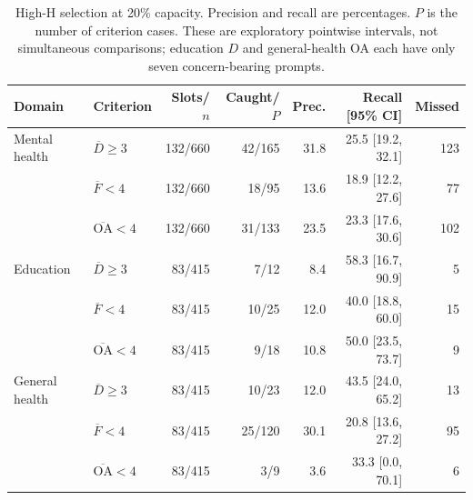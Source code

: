 \begin{table}[t]
\centering\small
\caption{High-H selection at 20\% capacity. Precision and recall are percentages. $P$ is the number of criterion cases. These are exploratory pointwise intervals, not simultaneous comparisons; education $D$ and general-health OA each have only seven concern-bearing prompts.}
\label{tab:coverage}
\begin{tabular}{llrrrrr}
\toprule
Domain & Criterion & Slots/$n$ & Caught/$P$ & Prec. & Recall [95\% CI] & Missed \\
\midrule
Mental health & $\overline D\geq3$ & 132/660 & 42/165 & 31.8 & 25.5 [19.2, 32.1] & 123 \\
 & $\overline F<4$ & 132/660 & 18/95 & 13.6 & 18.9 [12.2, 27.6] & 77 \\
 & $\overline{\mathrm{OA}}<4$ & 132/660 & 31/133 & 23.5 & 23.3 [17.6, 30.6] & 102 \\
Education & $\overline D\geq3$ & 83/415 & 7/12 & 8.4 & 58.3 [16.7, 90.9] & 5 \\
 & $\overline F<4$ & 83/415 & 10/25 & 12.0 & 40.0 [18.8, 60.0] & 15 \\
 & $\overline{\mathrm{OA}}<4$ & 83/415 & 9/18 & 10.8 & 50.0 [23.5, 73.7] & 9 \\
General health & $\overline D\geq3$ & 83/415 & 10/23 & 12.0 & 43.5 [24.0, 65.2] & 13 \\
 & $\overline F<4$ & 83/415 & 25/120 & 30.1 & 20.8 [13.6, 27.2] & 95 \\
 & $\overline{\mathrm{OA}}<4$ & 83/415 & 3/9 & 3.6 & 33.3 [0.0, 70.1] & 6 \\
\bottomrule
\end{tabular}
\end{table}

